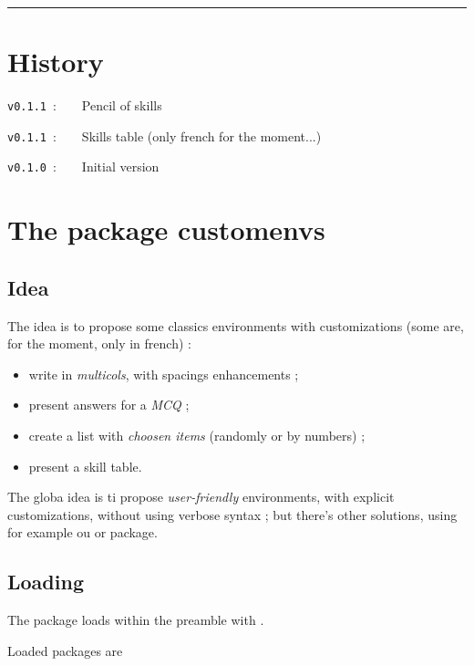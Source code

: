 \documentclass[english,11pt,a4paper]{article}
\begin{document}
\hrule

\vfill

\section{History}

\verb|v0.1.1|~:~~~~Pencil of skills

\verb|v0.1.1|~:~~~~Skills table (only french for the moment...)

\verb|v0.1.0|~:~~~~Initial version

\vspace*{5mm}

\pagebreak

\section{The package customenvs}

\subsection{Idea}

The idea is to propose some classics environments with customizations (some are, for the moment, only in french) :

\begin{itemize}
	\item write in \textit{multicols}, with spacings enhancements ;
	\item present answers for a \textit{MCQ} ;
	\item create a list with \textit{choosen items} (randomly or by numbers) ;
	\item present a skill table.
\end{itemize}

\smallskip

The globa idea is ti propose \textit{user-friendly} environments, with explicit customizations, without using verbose syntax ; but there's other solutions, using for example  ou  or  package.

\subsection{Loading}

The package loads within the preamble with .

Loaded packages are 
\end{document}
